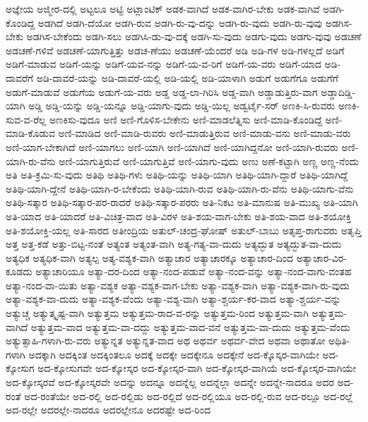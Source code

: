 {ಅಜ್ಞೇಯ
ಅಜ್ಮೀರ-ದಲ್ಲಿ
ಅಟ್ಟಲೂ
ಅಟ್ಟಿ
ಅಟ್ಲಾಂಟಿಕ್
ಅಡಕ-ವಾಗಿದೆ
ಅಡಕ-ವಾಗಿರ-ಬೇಕು
ಅಡಕ-ವಾಗಿವೆ
ಅಡಗಿ-ಕೊಂಡಿದ್ದ
ಅಡಗಿದೆ
ಅಡಗಿ-ದೆಯೋ
ಅಡಗಿ-ರುವ
ಅಡಗಿ-ರು-ವು-ದನ್ನು
ಅಡಗಿ-ರು-ವುದು
ಅಡಗಿ-ರು-ವುವು
ಅಡಗಿಸ-ಬೇಕು
ಅಡಗಿಸ-ಬೇಕೆಂದು
ಅಡಗಿ-ಸಲು
ಅಡಗಿಸಿ-ಡು-ವು-ದಕ್ಕೆ
ಅಡಗಿ-ಸು-ವುದು
ಅಡಗು-ವುದು
ಅಡಗು-ವುವು
ಅಡಚಣೆ
ಅಡಚಣೆ-ಗಳಿವೆ
ಅಡಚಣೆ-ಯಾಗುತ್ತಿತ್ತು
ಅಡಚ-ಣೆಯು
ಅಡಚಣೆ-ಯೆಂದರೆ
ಅಡಿ
ಅಡಿ-ಗಳ
ಅಡಿ-ಗಳಲ್ಲದೆ
ಅಡಿಗೆ
ಅಡಿಗೆ-ಮಾಡುವ
ಅಡಿಗೆ-ಯನ್ನು
ಅಡಿಗೆ-ಯವ-ನನ್ನು
ಅಡಿಗೆ-ಯ-ವ-ರಿಗೆ
ಅಡಿಗೆ-ಯ-ವರು
ಅಡಿಗೆ-ಯಾದ
ಅಡಿ-ದಾವರೆಗೆ
ಅಡಿ-ದಾವರೆ-ಯನ್ನು
ಅಡಿ-ದಾವರೆ-ಯಲ್ಲಿ
ಅಡಿ-ಯಲ್ಲಿ
ಅಡಿ-ಯಾಳಾಗಿ
ಅಡುಗೆ
ಅಡುಗೆಗೂ
ಅಡುಗೆಗೆ
ಅಡುಗೆ-ಮಾಡುವೆ
ಅಡುಗೆಯ
ಅಡುಗೆ-ಯ-ವರು
ಅಡ್ಡ
ಅಡ್ಡ-ಲಾ-ಗಿರಿಸಿ
ಅಡ್ಡ-ವಾಗಿ
ಅಡ್ಡಾಡುತ್ತಿರು-ವಾಗ
ಅಡ್ಡಾದಿಡ್ಡಿ-ಯಾಗಿ
ಅಡ್ಡಿ
ಅಡ್ಡಿ-ಯನ್ನು
ಅಡ್ಡಿ-ಯನ್ನೂ
ಅಡ್ಡಿ-ಯಾಗು-ವುದು
ಅಡ್ಡಿ-ಯಿಲ್ಲ
ಅಡ್ವರ್ಟೈ-ಸರ್
ಅಣಕಿ-ಸಿ-ರುವರು
ಅಣಕಿ-ಸುವ-ವ-ರೆಲ್ಲ
ಅಣಕಿಸು-ವುದೂ
ಅಣಿ
ಅಣಿ-ಗೊಳಿಸ-ಬೇಕೇನು
ಅಣಿ-ಮಾಡಲೆತ್ನಿಸು
ಅಣಿ-ಮಾಡಿ-ಕೊಂಡಿದ್ದೆ
ಅಣಿ-ಮಾಡಿ-ಕೊಡುವ
ಅಣಿ-ಮಾಡಿದ
ಅಣಿ-ಮಾಡಿ-ರುವರು
ಅಣಿ-ಮಾಡುತ್ತಿರುವ
ಅಣಿ-ಮಾಡು-ವನು
ಅಣಿ-ಮಾಡು-ವರು
ಅಣಿ-ಯಾಗ-ಬೇಕಾಗಿದೆ
ಅಣಿ-ಯಾಗಲು
ಅಣಿ-ಯಾಗಿ
ಅಣಿ-ಯಾಗಿದೆ
ಅಣಿ-ಯಾಗಿದ್ದನೋ
ಅಣಿ-ಯಾಗಿ-ರುವರು
ಅಣಿ-ಯಾಗಿ-ರು-ವೆನು
ಅಣಿ-ಯಾಗುತ್ತಿರುವೆ
ಅಣಿ-ಯಾಗುತ್ತಿವೆ
ಅಣಿ-ಯಾಗು-ವುದು
ಅಣು
ಅಣೆ-ಕಟ್ಟಾಗಿ
ಅಣ್ಣ
ಅಣ್ಣ-ನೆಂದು
ಅತಿ
ಅತಿ-ಕ್ರಮಿ-ಸು-ವುದು
ಅತಿಥಿ
ಅತಿಥಿ-ಗಳು
ಅತಿಥಿ-ಯನ್ನು
ಅತಿಥಿ-ಯಾಗಿ
ಅತಿಥಿ-ಯಾಗಿ-ದ್ದಾರೆ
ಅತಿಥಿ-ಯಾಗಿದ್ದೆ
ಅತಿಥಿ-ಯಾಗಿ-ದ್ದೇನೆ
ಅತಿಥಿ-ಯಾಗಿ-ರ-ಬೇಕೆಂದು
ಅತಿಥಿ-ಯಾಗಿ-ರುವ
ಅತಿಥಿ-ಯಾಗಿ-ರು-ವೆನು
ಅತಿಥಿ-ಯಾಗು-ವೆನು
ಅತಿಥಿ-ಸತ್ಕಾರ
ಅತಿಥಿ-ಸತ್ಕಾರ-ಪರ-ರಾದರೆ
ಅತಿಥಿ-ಸತ್ಕಾರ-ಪರರು
ಅತಿ-ನಿಕಟ
ಅತಿ-ಮಾನುಷ
ಅತಿ-ಮುಖ್ಯ
ಅತಿ-ಯಾಗಿ
ಅತಿ-ಯಾದ
ಅತಿ-ಯಾದರೆ
ಅತಿ-ವಿಚಿತ್ರ-ವಾದ
ಅತಿ-ವಿರಳ
ಅತಿ-ಶಯ-ವಾಗ-ಬೇಕು
ಅತಿ-ಶಯ-ವಾದ
ಅತಿ-ಶಯೋಕ್ತಿ
ಅತಿ-ಶಯೋಕ್ತಿ-ಯಲ್ಲ
ಅತಿ-ಸಾರದ
ಅತೀಂದ್ರಿಯ
ಅತುಲ್-ಚಂದ್ರ-ಘೋಷ್
ಅತುಲ್-ಬಾಬು
ಅತೃಪ್ತ-ರಾಗುವರು
ಅತೃಪ್ತಿ
ಅತ್ತ
ಅತ್ತ-ಕಡೆ
ಅತ್ತು-ಬಿಟ್ಟ-ನಂತೆ
ಅತ್ಯಂತ
ಅತ್ಯಂತ-ವಾಗಿ
ಅತ್ಯ-ಗತ್ಯ-ವಾ-ದುದು
ಅತ್ಯದ್ಭುತ
ಅತ್ಯದ್ಭುತ-ವಾ-ದುದು
ಅತ್ಯಧಿಕ
ಅತ್ಯಧಿಕ-ವಾಗಿ
ಅತ್ಯಲ್ಪ
ಅತ್ಯ-ವಶ್ಯಕ-ವಾಗಿ
ಅತ್ಯಾಚಾರ
ಅತ್ಯಾಚಾರಕ್ಕೂ
ಅತ್ಯಾಚಾರ-ದಿಂದ
ಅತ್ಯಾಚಾರ-ವಿರ-ಕೂಡದು
ಅತ್ಯಾಚಾರಿಯೂ
ಅತ್ಯಾ-ದರ-ದಿಂದ
ಅತ್ಯಾ-ನಂದ-ಪಡುವೆ
ಅತ್ಯಾ-ನಂದ-ವನ್ನು
ಅತ್ಯಾ-ನಂದ-ವಾಗು-ವಂತಹ
ಅತ್ಯಾ-ನಂದ-ವಾ-ಯಿತು
ಅತ್ಯಾ-ವಶ್ಯಕ
ಅತ್ಯಾ-ವಶ್ಯಕ-ವಾಗ-ಬೇಕು
ಅತ್ಯಾ-ವಶ್ಯಕ-ವಾಗಿ
ಅತ್ಯಾ-ವಶ್ಯಕ-ವಾಗಿ-ರು-ವುದು
ಅತ್ಯಾ-ವಶ್ಯಕ-ವಾ-ದುದು
ಅತ್ಯಾ-ವಶ್ಯಕ-ವೆಂದು
ಅತ್ಯಾ-ವಶ್ಯ-ವಾಗಿ
ಅತ್ಯಾ-ಶ್ಚರ್ಯ-ಕರ-ವಾದ
ಅತ್ಯಾ-ಶ್ಚರ್ಯ-ವನ್ನು
ಅತ್ಯುಚ್ಚ
ಅತ್ಯುತ್ಕೃಷ್ಟ-ವಾಗಿ
ಅತ್ಯುತ್ತಮ
ಅತ್ಯುತ್ತಮ-ರಾದ-ವ-ರನ್ನು
ಅತ್ಯುತ್ತಮ-ರಿಂದ
ಅತ್ಯುತ್ತಮ-ವಾಗಿ
ಅತ್ಯುತ್ತಮ-ವಾಗಿದೆ
ಅತ್ಯುತ್ತಮ-ವಾದ
ಅತ್ಯುತ್ತಮ-ವಾ-ದದ್ದು
ಅತ್ಯುತ್ತಮ-ವಾದ-ವನೆ
ಅತ್ಯುತ್ತಮ-ವಾ-ದುದು
ಅತ್ಯುತ್ತಮ-ವೆಂದು
ಅತ್ಯುತ್ಸಾಹಿ-ಗಳಾಗಿ-ರು-ವರು
ಅತ್ಯುನ್ನತ
ಅತ್ಯುನ್ನತ-ವಾದ
ಅಥ
ಅಥರ್ವ
ಅಥರ್ವ-ವೇದ
ಅಥವಾ
ಅಥಾತೋ
ಅಥಿತಿ-ಗಳಾಗಿ
ಅದಕ್ಕಾಗಿ
ಅದಕ್ಕಿಂತ
ಅದಕ್ಕಿಂತಲೂ
ಅದಕ್ಕೆ
ಅದಕ್ಕೇ
ಅದಕ್ಕೇನೂ
ಅದಕ್ಕೇನೆ
ಅದ-ಕ್ಕೊಸ್ಕರ-ವಾಗಿಯೇ
ಅದ-ಕ್ಕೋಸುಗ
ಅದ-ಕ್ಕೋಸುಗವೇ
ಅದ-ಕ್ಕೋಸ್ಕರ
ಅದ-ಕ್ಕೋಸ್ಕರ-ವಾಗಿ
ಅದ-ಕ್ಕೋಸ್ಕರ-ವಾಗಿಯೆ
ಅದ-ಕ್ಕೋಸ್ಕರ-ವಾಗಿಯೇ
ಅದ-ಕ್ಕೋಸ್ಕರವೆ
ಅದ-ಕ್ಕೋಸ್ಕರವೇ
ಅದನ್ನು
ಅದನ್ನೂ
ಅದನ್ನೆಲ್ಲ
ಅದನ್ನೆಲ್ಲಾ
ಅದನ್ನೇ
ಅದನ್ನೇ-ನಾದರೂ
ಅದರ
ಅದ-ರಂತೆ
ಅದ-ರಂತೆಯೇ
ಅದ-ರಲ್ಲಿ
ಅದ-ರಲ್ಲಿಡು
ಅದ-ರಲ್ಲಿದೆ
ಅದ-ರಲ್ಲಿಯೂ
ಅದ-ರಲ್ಲಿ-ರುವ
ಅದ-ರಲ್ಲೂ
ಅದ-ರಲ್ಲೆ
ಅದ-ರಲ್ಲೇ
ಅದರಲ್ಲೇ-ನಾದರೂ
ಅದರಲ್ಲೇನೂ
ಅದರಷ್ಟೇ
ಅದ-ರಿಂದ
}
